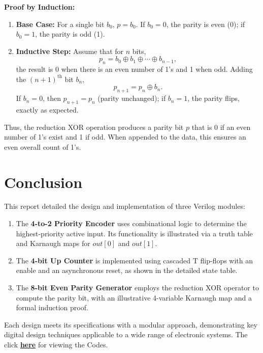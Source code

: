 \documentclass[11pt]{article}
\begin{document}
\textbf{Proof by Induction:}
\begin{enumerate}
    \item \textbf{Base Case:} For a single bit \(b_0\), \(p = b_0\). If \(b_0=0\), the parity is even (0); if \(b_0=1\), the parity is odd (1).
    \item \textbf{Inductive Step:} Assume that for \(n\) bits,
    \[
    p_n = b_0 \oplus b_1 \oplus \cdots \oplus b_{n-1},
    \]
    the result is 0 when there is an even number of 1's and 1 when odd. Adding the \((n+1)^\text{th}\) bit \(b_n\),
    \[
    p_{n+1} = p_n \oplus b_n.
    \]
    If \(b_n=0\), then \(p_{n+1}=p_n\) (parity unchanged); if \(b_n=1\), the parity flips, exactly as expected.
\end{enumerate}
Thus, the reduction XOR operation produces a parity bit \(p\) that is 0 if an even number of 1's exist and 1 if odd. When appended to the data, this ensures an even overall count of 1's.

\section{Conclusion}
This report detailed the design and implementation of three Verilog modules:
\begin{enumerate}
    \item The \textbf{4-to-2 Priority Encoder} uses combinational logic to determine the highest-priority active input. Its functionality is illustrated via a truth table and Karnaugh maps for \({out[0]}\) and \({out[1]}\).
    \item The \textbf{4-bit Up Counter} is implemented using cascaded T flip-flops with an enable and an asynchronous reset, as shown in the detailed state table.
    \item The \textbf{8-bit Even Parity Generator} employs the reduction XOR operator to compute the parity bit, with an illustrative 4-variable Karnaugh map and a formal induction proof.
\end{enumerate}
Each design meets its specifications with a modular approach, demonstrating key digital design techniques applicable to a wide range of electronic systems.
The click \href{https://github.com/AbhimanyuKoushik/Academics/tree/main/Digital\%20Systems\%20Lab/Assignment1}{\textbf{here}} for viewing the Codes.
\end{document}
